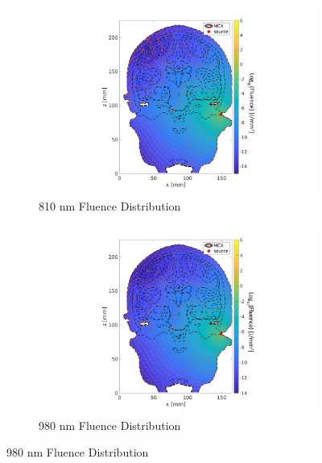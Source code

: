 \documentclass[journal,twoside,web]{ieeecolor}
\begin{document}
\begin{figure}[hbt!]
    \begin{subfigure}{.475\linewidth}
      \includegraphics[width=\linewidth]{Figures/Fluence_Distribution_810nm_Cochlear.png}
      \caption{810 nm Fluence Distribution}
      \label{fig:810Fluence}
    \end{subfigure}
    \hfill
    \begin{subfigure}{.5\linewidth}
      \includegraphics[width=\linewidth]{Figures/Fluence_Distribution_980nm_Cochlear.png}
      \caption{980 nm Fluence Distribution}
      \label{fig:980Fluence}
    \end{subfigure}
    

\end{figure}
\end{document}
